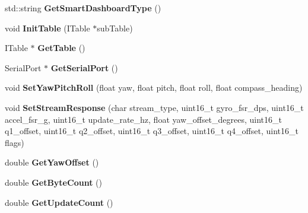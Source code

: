 \begin{DoxyCompactItemize}
\item 
\hypertarget{class_i_m_u_ac1b122983651c9f0d8892aceecaaba7e}{}std\+::string {\bfseries Get\+Smart\+Dashboard\+Type} ()\label{class_i_m_u_ac1b122983651c9f0d8892aceecaaba7e}

\item 
\hypertarget{class_i_m_u_a0f1e2ba7829c650d1e423f51db79fab0}{}void {\bfseries Init\+Table} (I\+Table $\ast$sub\+Table)\label{class_i_m_u_a0f1e2ba7829c650d1e423f51db79fab0}

\item 
\hypertarget{class_i_m_u_a46fafeeb45fa63fd8876501fb270eaa9}{}I\+Table $\ast$ {\bfseries Get\+Table} ()\label{class_i_m_u_a46fafeeb45fa63fd8876501fb270eaa9}

\item 
\hypertarget{class_i_m_u_ad9b522b7a9e8843d1d042f22accb3d03}{}Serial\+Port $\ast$ {\bfseries Get\+Serial\+Port} ()\label{class_i_m_u_ad9b522b7a9e8843d1d042f22accb3d03}

\item 
\hypertarget{class_i_m_u_aa1e9bc2d755f8ec367d13b7440554a9c}{}void {\bfseries Set\+Yaw\+Pitch\+Roll} (float yaw, float pitch, float roll, float compass\+\_\+heading)\label{class_i_m_u_aa1e9bc2d755f8ec367d13b7440554a9c}

\item 
\hypertarget{class_i_m_u_a3c355546b9b43fa8fb5d82d5dd030ca1}{}void {\bfseries Set\+Stream\+Response} (char stream\+\_\+type, uint16\+\_\+t gyro\+\_\+fsr\+\_\+dps, uint16\+\_\+t accel\+\_\+fsr\+\_\+g, uint16\+\_\+t update\+\_\+rate\+\_\+hz, float yaw\+\_\+offset\+\_\+degrees, uint16\+\_\+t q1\+\_\+offset, uint16\+\_\+t q2\+\_\+offset, uint16\+\_\+t q3\+\_\+offset, uint16\+\_\+t q4\+\_\+offset, uint16\+\_\+t flags)\label{class_i_m_u_a3c355546b9b43fa8fb5d82d5dd030ca1}

\item 
\hypertarget{class_i_m_u_abff8d4585010a9d47ac436a3b88c75a4}{}double {\bfseries Get\+Yaw\+Offset} ()\label{class_i_m_u_abff8d4585010a9d47ac436a3b88c75a4}

\item 
\hypertarget{class_i_m_u_a35cf0cb6759d187a1d436865aeda8720}{}double {\bfseries Get\+Byte\+Count} ()\label{class_i_m_u_a35cf0cb6759d187a1d436865aeda8720}

\item 
\hypertarget{class_i_m_u_aeaa93015313fcc79326bb5e81ab48e00}{}double {\bfseries Get\+Update\+Count} ()\label{class_i_m_u_aeaa93015313fcc79326bb5e81ab48e00}


\end{DoxyCompactItemize}
